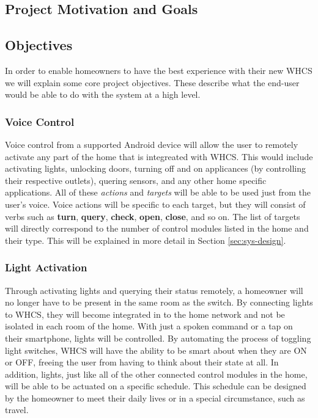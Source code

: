 
\subsection{Project Motivation and Goals}

\subsection{Objectives}
In order to enable homeowners to have the best experience with their new WHCS
we will explain some core project objectives. These describe what the end-user
would be able to do with the system at a high level.

\subsubsection{Voice Control}
Voice control
from a supported Android device will allow the user to remotely activate any
part of the home that is integreated with WHCS. This would include activating
lights, unlocking doors, turning off and on applicances (by controlling their
respective outlets), quering sensors, and any other home specific applications.
All of these \emph{actions} and \emph{targets} will be able to be used just
from the user's voice. Voice actions will be specific to each target, but they
will consist of verbs such as \textbf{turn}, \textbf{query}, \textbf{check},
\textbf{open}, \textbf{close}, and so on. The list of targets will directly
correspond to the number of control modules listed in the home and their type.
This will be explained in more detail in Section \ref{sec:sys-design}.

\subsubsection{Light Activation}
Through activating lights and querying their status remotely, a homeowner will
no longer have to be present in the same room as the switch.  By connecting
lights to WHCS, they will become integrated in to the home network and not be
isolated in each room of the home.  With just a spoken command or a tap on
their smartphone, lights will be controlled.  By automating the process of
toggling light switches, WHCS will have the ability to be smart about when they
are ON or OFF, freeing the user from having to think about their state at all.
In addition, lights, just like all of the other connected control modules in
the home, will be able to be actuated on a specific schedule. This schedule
 can be designed by the homeowner
to meet their daily lives or in a special circumstance, such as travel.

